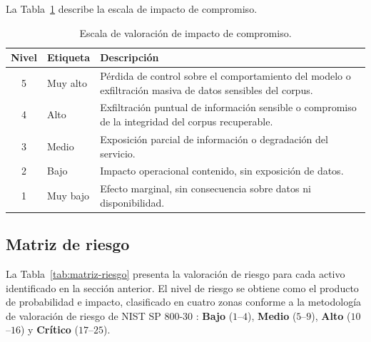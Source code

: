La Tabla~\ref{tab:escala-impacto} describe la escala de impacto de compromiso.

\begin{table}[H]
  \centering
  \caption{Escala de valoración de impacto de compromiso.}
  \label{tab:escala-impacto}
  \begin{tabularx}{\textwidth}{@{} c l >{\raggedright\arraybackslash}X @{}}
    \toprule
    \textbf{Nivel} & \textbf{Etiqueta} & \textbf{Descripción} \\
    \midrule
    5 & Muy alto & Pérdida de control sobre el comportamiento del modelo o exfiltración masiva de datos sensibles del corpus. \\
    4 & Alto     & Exfiltración puntual de información sensible o compromiso de la integridad del corpus recuperable. \\
    3 & Medio    & Exposición parcial de información o degradación del servicio. \\
    2 & Bajo     & Impacto operacional contenido, sin exposición de datos. \\
    1 & Muy bajo & Efecto marginal, sin consecuencia sobre datos ni disponibilidad. \\
    \bottomrule
  \end{tabularx}
\end{table}

\subsection{Matriz de riesgo}


La Tabla~\ref{tab:matriz-riesgo} presenta la valoración de riesgo para cada activo identificado en la sección anterior. El nivel de riesgo se obtiene como el producto de probabilidad e impacto, clasificado en cuatro zonas conforme a la metodología de valoración de riesgo de NIST SP 800-30 \cite{nist80030}: \textbf{Bajo} ($1$--$4$), \textbf{Medio} ($5$--$9$), \textbf{Alto} ($10$--$16$) y \textbf{Crítico} ($17$--$25$).

